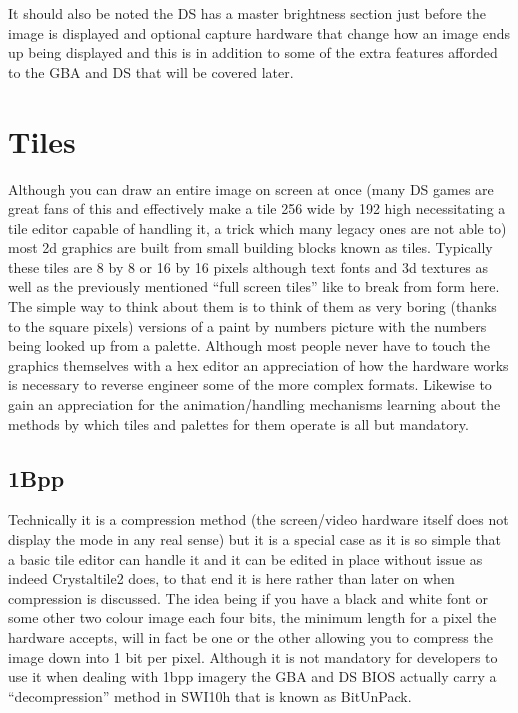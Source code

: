 \documentclass[
]{book}
\begin{document}
It should also be noted the DS has a master brightness section just before the image is displayed and optional capture hardware that change how an image ends up being displayed and this is in addition to some of the extra features afforded to the GBA and DS that will be covered later.

\hypertarget{tiles}{%
\section{Tiles}\label{tiles}}

Although you can draw an entire image on screen at once (many DS games are great fans of this and effectively make a tile 256 wide by 192 high necessitating a tile editor capable of handling it, a trick which many legacy ones are not able to) most 2d graphics are built from small building blocks known as tiles. Typically these tiles are 8 by 8 or 16 by 16 pixels although text fonts and 3d textures as well as the previously mentioned ``full screen tiles'' like to break from form here. The simple way to think about them is to think of them as very boring (thanks to the square pixels) versions of a paint by numbers picture with the numbers being looked up from a palette. Although most people never have to touch the graphics themselves with a hex editor an appreciation of how the hardware works is necessary to reverse engineer some of the more complex formats. Likewise to gain an appreciation for the animation/handling mechanisms learning about the methods by which tiles and palettes for them operate is all but mandatory.

\hypertarget{bpp}{%
\subsection{1Bpp}\label{bpp}}

Technically it is a compression method (the screen/video hardware itself does not display the mode in any real sense) but it is a special case as it is so simple that a basic tile editor can handle it and it can be edited in place without issue as indeed Crystaltile2 does, to that end it is here rather than later on when compression is discussed. The idea being if you have a black and white font or some other two colour image each four bits, the minimum length for a pixel the hardware accepts, will in fact be one or the other allowing you to compress the image down into 1 bit per pixel. Although it is not mandatory for developers to use it when dealing with 1bpp imagery the GBA and DS BIOS actually carry a ``decompression'' method in SWI10h that is known as BitUnPack.
\end{document}
